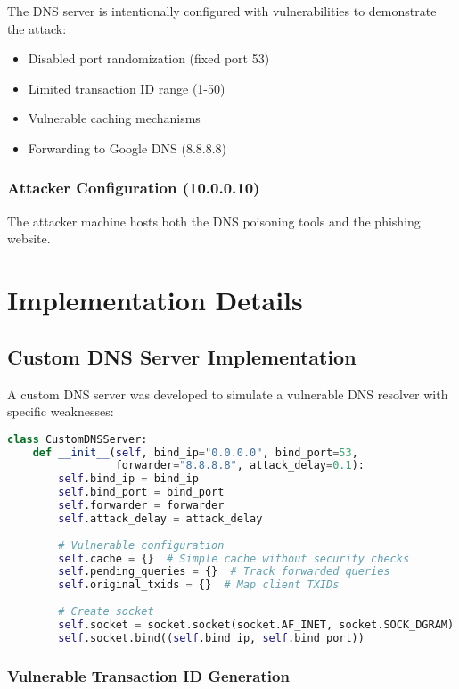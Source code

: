 \documentclass[12pt,a4paper]{article}
\begin{document}
The DNS server is intentionally configured with vulnerabilities to demonstrate the attack:

\begin{itemize}
    \item Disabled port randomization (fixed port 53)
    \item Limited transaction ID range (1-50)
    \item Vulnerable caching mechanisms
    \item Forwarding to Google DNS (8.8.8.8)
\end{itemize}

\subsubsection{Attacker Configuration (10.0.0.10)}

The attacker machine hosts both the DNS poisoning tools and the phishing website.

\section{Implementation Details}

\subsection{Custom DNS Server Implementation}

A custom DNS server was developed to simulate a vulnerable DNS resolver with specific weaknesses:

\begin{lstlisting}[language=python, caption=Custom DNS Server - Main Class Structure]
class CustomDNSServer:
    def __init__(self, bind_ip="0.0.0.0", bind_port=53, 
                 forwarder="8.8.8.8", attack_delay=0.1):
        self.bind_ip = bind_ip
        self.bind_port = bind_port
        self.forwarder = forwarder
        self.attack_delay = attack_delay
        
        # Vulnerable configuration
        self.cache = {}  # Simple cache without security checks
        self.pending_queries = {}  # Track forwarded queries
        self.original_txids = {}  # Map client TXIDs
        
        # Create socket
        self.socket = socket.socket(socket.AF_INET, socket.SOCK_DGRAM)
        self.socket.bind((self.bind_ip, self.bind_port))
\end{lstlisting}

\subsubsection{Vulnerable Transaction ID Generation}
\end{document}
